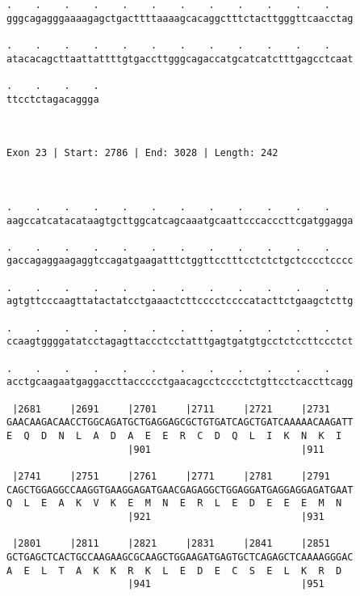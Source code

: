 \documentclass{article}
\begin{document}
\begin{Verbatim}
.    .    .    .    .    .    .    .    .    .    .    .    
gggcagagggaaaagagctgacttttaaaagcacaggctttctacttgggttcaacctag
                                                            
.    .    .    .    .    .    .    .    .    .    .    .    
atacacagcttaattattttgtgaccttgggcagaccatgcatcatctttgagcctcaat
                                                            
.    .    .    .
ttcctctagacaggga
                
                
 
Exon 23 | Start: 2786 | End: 3028 | Length: 242



.    .    .    .    .    .    .    .    .    .    .    .    
aagccatcatacataagtgcttggcatcagcaaatgcaattcccacccttcgatggagga
                                                            
.    .    .    .    .    .    .    .    .    .    .    .    
gaccagaggaagaggtccagatgaagatttctggttcctttcctctctgctcccctcccc
                                                            
.    .    .    .    .    .    .    .    .    .    .    .    
agtgttcccaagttatactatcctgaaactcttcccctccccatacttctgaagctcttg
                                                            
.    .    .    .    .    .    .    .    .    .    .    .    
ccaagtggggatatcctagagttaccctcctatttgagtgatgtgcctctccttccctct
                                                            
.    .    .    .    .    .    .    .    .    .    .    .    
acctgcaagaatgaggaccttaccccctgaacagcctcccctctgttcctcaccttcagg
                                                            
 |2681     |2691     |2701     |2711     |2721     |2731    
GAACAAGACAACCTGGCAGATGCTGAGGAGCGCTGTGATCAGCTGATCAAAAACAAGATT
E  Q  D  N  L  A  D  A  E  E  R  C  D  Q  L  I  K  N  K  I  
                     |901                          |911     
  
 |2741     |2751     |2761     |2771     |2781     |2791    
CAGCTGGAGGCCAAGGTGAAGGAGATGAACGAGAGGCTGGAGGATGAGGAGGAGATGAAT
Q  L  E  A  K  V  K  E  M  N  E  R  L  E  D  E  E  E  M  N  
                     |921                          |931     
  
 |2801     |2811     |2821     |2831     |2841     |2851    
GCTGAGCTCACTGCCAAGAAGCGCAAGCTGGAAGATGAGTGCTCAGAGCTCAAAAGGGAC
A  E  L  T  A  K  K  R  K  L  E  D  E  C  S  E  L  K  R  D  
                     |941                          |951     
  

\end{Verbatim}
\end{document}
